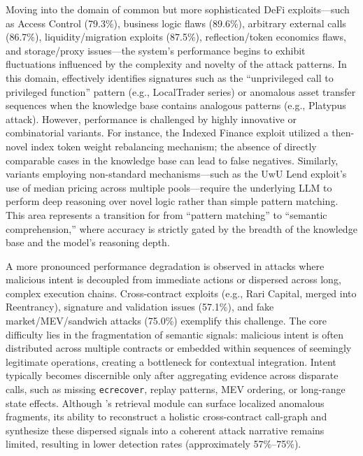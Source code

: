 Moving into the domain of common but more sophisticated DeFi exploits---such as Access Control (79.3\%), business logic flaws (89.6\%), arbitrary external calls (86.7\%), liquidity/migration exploits (87.5\%), reflection/token economics flaws, and storage/proxy issues---the system’s performance begins to exhibit fluctuations influenced by the complexity and novelty of the attack patterns. In this domain, \approach{} effectively identifies signatures such as the ``unprivileged call to privileged function'' pattern (e.g., LocalTrader series) or anomalous asset transfer sequences when the knowledge base contains analogous patterns (e.g., Platypus attack). However, performance is challenged by highly innovative or combinatorial variants. For instance, the Indexed Finance exploit utilized a then-novel index token weight rebalancing mechanism; the absence of directly comparable cases in the knowledge base can lead to false negatives. Similarly, variants employing non-standard mechanisms---such as the UwU Lend exploit’s use of median pricing across multiple pools---require the underlying LLM to perform deep reasoning over novel logic rather than simple pattern matching. This area represents a transition for \approach{} from ``pattern matching'' to ``semantic comprehension,'' where accuracy is strictly gated by the breadth of the knowledge base and the model’s reasoning depth.

A more pronounced performance degradation is observed in attacks where malicious intent is decoupled from immediate actions or dispersed across long, complex execution chains. Cross-contract exploits (e.g., Rari Capital, merged into Reentrancy), signature and validation issues (57.1\%), and fake market/MEV/sandwich attacks (75.0\%) exemplify this challenge. The core difficulty lies in the fragmentation of semantic signals: malicious intent is often distributed across multiple contracts or embedded within sequences of seemingly legitimate operations, creating a bottleneck for contextual integration. Intent typically becomes discernible only after aggregating evidence across disparate calls, such as missing \texttt{ecrecover}, replay patterns, MEV ordering, or long-range state effects. Although \approach{}’s retrieval module can surface localized anomalous fragments, its ability to reconstruct a holistic cross-contract call-graph and synthesize these dispersed signals into a coherent attack narrative remains limited, resulting in lower detection rates (approximately 57\%--75\%).


